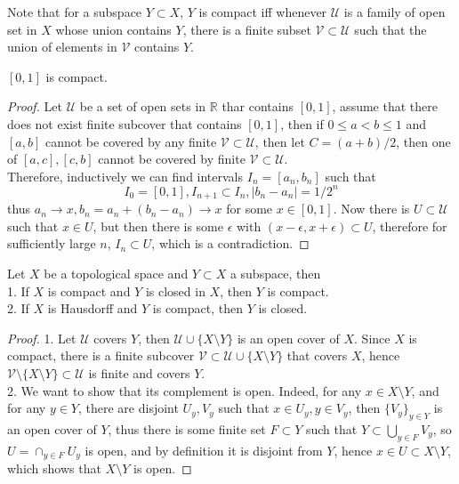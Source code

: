 Note that for a subspace $Y\subset X$, $Y$ is compact iff whenever $\mathscr U$ is a family of open set in $X$ whose union contains $Y$, there is a finite subset $\mathscr V\subset \mathscr U$ such that the union of elements in $\mathscr V$ contains $Y$.
\begin{theorem}\label{01compact}
    $[0,1]$ is compact.
\end{theorem}
\begin{proof}
    Let $\mathscr U$ be a set of open sets in $\mathbb R$ thar contains $[0,1]$, assume that there does not exist finite subcover that contains $[0,1]$, then if $0\le a<b\le 1$ and $[a,b]$ cannot be covered by any finite $\mathscr V\subset\mathscr U$, then let $C=(a+b)/2$, then one of $[a,c],[c,b]$ cannot be covered by finite $\mathscr V\subset\mathscr U$.\\
    Therefore, inductively we can find intervals $I_n=[a_n,b_n]$ such that $$I_0=[0,1],I_{n+1}\subset I_n,|b_n-a_n|=1/2^n$$
    thus $a_n\to x,b_n=a_n+(b_n-a_n)\to x$ for some $x\in [0,1]$.
    Now there is $U\subset \mathscr U$ such that $x\in U$, but then there is some $\epsilon$ with $(x-\epsilon,x+\epsilon)\subset U$, therefore for sufficiently large $n$, $I_n\subset U$, which is a contradiction.
\end{proof}
\begin{proposition}\label{compact_haus_closed}
    Let $X$ be a topological space and $Y\subset X$ a subspace, then\\
    1. If $X$ is compact and $Y$ is closed in $X$, then $Y$ is compact.\\
    2. If $X$ is Hausdorff and $Y$ is compact, then $Y$ is closed.
\end{proposition}
\begin{proof}
    1. Let $\mathscr U$ covers $Y$, then $\mathscr U\cup \{X\setminus Y\}$ is an open cover of $X$.
    Since $X$ is compact, there is a finite subcover $\mathscr V\subset \mathscr U\cup \{X\setminus Y\}$ that covers $X$, hence $\mathscr V\setminus\{X\setminus Y\}\subset \mathscr U$ is finite and covers $Y$.\\
    2. We want to show that its complement is open.
    Indeed, for any $x\in X\setminus Y$, and for any $y\in Y$, there are disjoint $U_y,V_y$ such that $x\in U_y,y\in V_y$, then $\{V_y\}_{y\in Y}$ is an open cover of $Y$, thus there is some finite set $F\subset Y$ such that $Y\subset\bigcup_{y\in F}V_y$, so $U=\cap_{y\in F}U_y$ is open, and by definition it is disjoint from $Y$, hence $x\in U\subset X\setminus Y$, which shows that $X\setminus Y$ is open.
\end{proof}
